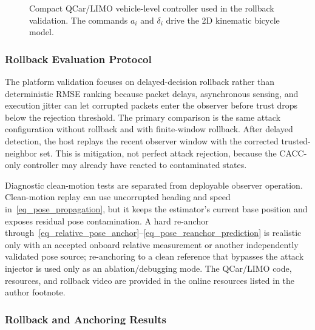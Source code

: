 \documentclass[letterpaper,journal]{IEEEtran}
\begin{document}
\begin{figure}[!t]
{}
    \caption{Compact QCar/LIMO vehicle-level controller used in the rollback validation. The commands $a_i$ and $\delta_i$ drive the 2D kinematic bicycle model.}
    \label{fig:qcar_limo_vehicle_structure}
\end{figure}

\subsubsection{Rollback Evaluation Protocol}

The platform validation focuses on delayed-decision rollback rather than deterministic RMSE ranking because packet delays, asynchronous sensing, and execution jitter can let corrupted packets enter the observer before trust drops below the rejection threshold. The primary comparison is the same attack configuration without rollback and with finite-window rollback. After delayed detection, the host replays the recent observer window with the corrected trusted-neighbor set. This is mitigation, not perfect attack rejection, because the CACC-only controller may already have reacted to contaminated states.

Diagnostic clean-motion tests are separated from deployable observer operation. Clean-motion replay can use uncorrupted heading and speed in~\eqref{eq_pose_propagation}, but it keeps the estimator's current base position and exposes residual pose contamination. A hard re-anchor through~\eqref{eq_relative_pose_anchor}--\eqref{eq_pose_reanchor_prediction} is realistic only with an accepted onboard relative measurement or another independently validated pose source; re-anchoring to a clean reference that bypasses the attack injector is used only as an ablation/debugging mode. The QCar/LIMO code, resources, and rollback video are provided in the online resources listed in the author footnote.

\subsubsection{Rollback and Anchoring Results}
\end{document}
